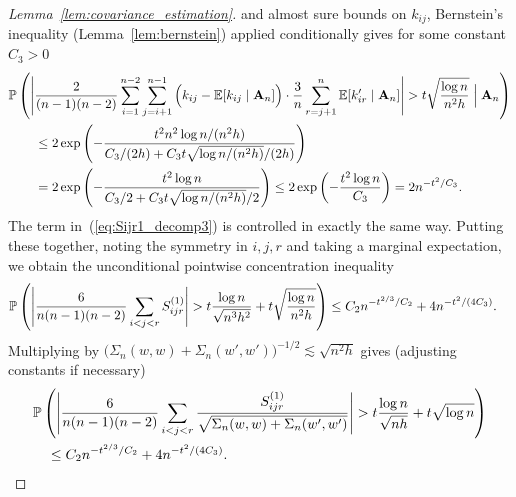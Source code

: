 \begin{proof}[Lemma~\ref{lem:covariance_estimation}]
  and almost sure bounds on $k_{i j}$,
  Bernstein's inequality
  (Lemma~\ref{lem:bernstein})
  applied conditionally
  gives for some constant $C_3 > 0$
  \begin{align*}
    &\P\left(
      \Bigg|
      \frac{2}{(n-1)(n-2)}
      \sum_{i=1}^{n-2}
      \sum_{j=i+1}^{n-1}
      \Big(
        k_{i j}
        - \E[k_{i j} \mid \bA_n]
      \Big)
      \cdot \frac{3}{n}
      \sum_{r=j+1}^n
      \E[k_{i r}' \mid \bA_n]
      \Bigg|
      > t
      \sqrt{\frac{\log n}{n^2h}}
      \Bigm\vert \bA_n
    \right) \\
    &\qquad\leq
    2 \exp \left( -
      \frac{t^2 n^2 \log n / (n^2h)}
      {C_3/(2h) + C_3 t \sqrt{\log n / (n^2h)} / (2h)}
    \right) \\
    &\qquad=
    2 \exp \left( -
      \frac{t^2 \log n}
      {C_3/2 + C_3 t \sqrt{\log n / (n^2h)} / 2}
    \right)
    \leq
    2 \exp \left( -
      \frac{t^2 \log n}{C_3}
    \right)
    =
    2 n^{-t^2 / C_3}.
  \end{align*}
  The term in~(\ref{eq:Sijr1_decomp3})
  is controlled in exactly the same way.
  Putting these together, noting the symmetry in $i,j,r$
  and taking a marginal expectation,
  we obtain the unconditional pointwise concentration inequality
  \begin{align*}
    \P\left(
      \Bigg|
      \frac{6}{n(n-1)(n-2)}
      \sum_{i<j<r}
      S_{i j r}^{(1)}
      \Bigg|
      > t
      \frac{\log n}{\sqrt{n^3h^2}}
      + t \sqrt{\frac{\log n}{n^2h}}
    \right)
    &\leq
    C_2 n^{-t^{2/3} / C_2}
    + 4 n^{-t^2 / (4C_3)}.
  \end{align*}
  Multiplying by
  $\big(\Sigma_n(w,w) + \Sigma_n(w',w')\big)^{-1/2} \lesssim \sqrt{n^2h}$
  gives (adjusting constants if necessary)
  \begin{align*}
    &\P\left(
      \Bigg|
      \frac{6}{n(n-1)(n-2)}
      \sum_{i<j<r}
      \frac{S_{i j r}^{(1)}}
      {\sqrt{\Sigma_n(w,w) + \Sigma_n(w',w')}}
      \Bigg|
      > t \frac{\log n}{\sqrt{n h}}
      + t \sqrt{\log n}
    \right) \\
    &\quad\leq
    C_2 n^{-t^{2/3} / C_2}
    + 4 n^{-t^2 / (4C_3)}.
  \end{align*}



\end{proof}
